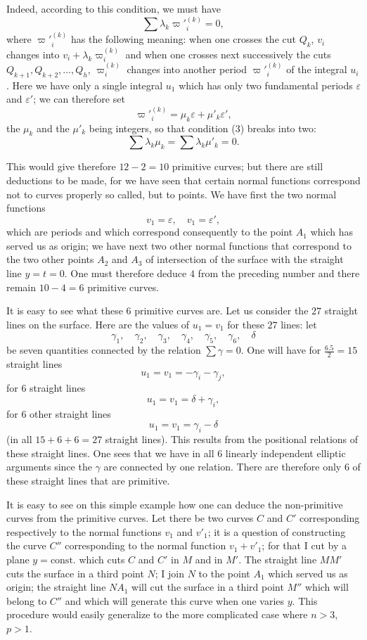 \documentclass{article}
\begin{document}
Indeed, according to this condition, we must have
\[
\sum \lambda_{k} \varpi'^{(k)}_{i} = 0, \tag{3}
\]
where $\varpi'^{(k)}_{i}$ has the following meaning: when one crosses the cut $Q_{k}$, $v_{i}$ changes into $v_{i} + \lambda_{k} \varpi_{i}^{(k)}$ and when one crosses next successively the cuts $Q_{k+1}, Q_{k+2}, \ldots, Q_{h}$, $\varpi_{i}^{(k)}$ changes into another period $\varpi'^{(k)}_{i}$ of the integral $u_{i}$. Here we have only a single integral $u_{1}$ which has only two fundamental periods $\varepsilon$ and $\varepsilon'$; we can therefore set
\[
\varpi'^{(k)}_{i} = \mu_{k} \varepsilon + \mu'_{k} \varepsilon',
\]
the $\mu_{k}$ and the $\mu'_{k}$ being integers, so that condition (3) breaks into two:
\[
\sum \lambda_{k} \mu_{k} = \sum \lambda_{k} \mu'_{k} = 0. \tag{4}
\]

This would give therefore $12 - 2 = 10$ primitive curves; but there are still deductions to be made, for we have seen that certain normal functions correspond not to curves properly so called, but
to points. We have first the two normal functions
\[
v_{1} = \varepsilon, \quad v_{1} = \varepsilon',
\]
which are periods and which correspond consequently to the point $A_{1}$ which has served us as origin; we have next two other normal functions that correspond to the two other points $A_{2}$ and $A_{3}$ of intersection of the surface with the straight line $y = t = 0$. One must therefore deduce $4$ from the preceding number and there remain $10 - 4 = 6$ primitive curves.

It is easy to see what these $6$ primitive curves are. Let us consider the $27$ straight lines on the surface. Here are the values of $u_{1} = v_{1}$ for these $27$ lines: let
\[
\gamma_{1}, \quad \gamma_{2}, \quad \gamma_{3}, \quad \gamma_{4}, \quad \gamma_{5}, \quad \gamma_{6}, \quad \delta
\]
be seven quantities connected by the relation $\displaystyle\sum \gamma = 0$. One will have for $\frac{6.5}{2} = 15$ straight lines
\[
u_{1} = v_{1} = -\gamma_{i} - \gamma_{j},
\]
for $6$ straight lines
\[
u_{1} = v_{1} = \delta + \gamma_{i},
\]
for $6$ other straight lines
\[
u_{1} = v_{1} = \gamma_{i} - \delta
\]
(in all $15 + 6 + 6 = 27$ straight lines). This results from the positional relations of these straight lines. One sees that we have in all $6$ linearly independent elliptic arguments since the $\gamma$ are connected by one relation. There are therefore only $6$ of these straight lines that are primitive.

It is easy to see on this simple example how one can deduce the non-primitive curves from the primitive curves. Let there be two curves $C$ and $C'$ corresponding respectively to the normal functions $v_{1}$ and $v'_{1}$; it is a question of constructing the curve $C''$ corresponding to the normal function $v_{1} + v'_{1}$; for that I cut by a plane $y = \text{const.}$ which cuts $C$ and $C'$ in $M$ and in $M'$. The straight line $M M'$ cuts the surface in a third point $N$; I join $N$ to the point $A_{1}$ which served us as origin; the straight line $N A_{1}$ will cut the surface in a third point $M''$ which will belong to $C''$ and which will generate this curve when one varies $y$. This procedure would easily generalize to the more complicated case where $n > 3$, $p > 1$.
\end{document}
